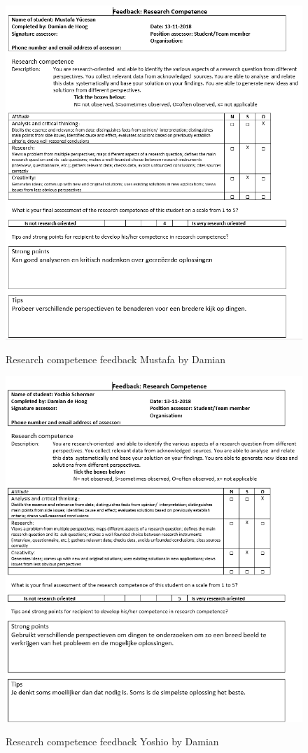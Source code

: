 \documentclass[12pt]{article}
\begin{document}
	\begin{figure}[p!]
		\centering
		\includegraphics[width=\columnwidth]{ResSklMustafa.PNG}\\
		\caption{Research competence feedback Mustafa by Damian}
	\end{figure}
	\begin{figure}[p!]
		\centering
		\includegraphics[width=\columnwidth]{ResSklYoshio.PNG}\\
		\caption{Research competence feedback Yoshio by Damian}
	\end{figure}
\end{document}
